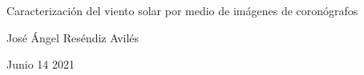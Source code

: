 \begin{titlepage}
\centering


{\Huge Caracterización del viento solar por medio de imágenes de coronógrafos \par}

\bigskip

{\Large José Ángel Reséndiz Avilés \par}

{\Large Junio 14 2021 \par}


\end{titlepage}

\cleardoublepage

